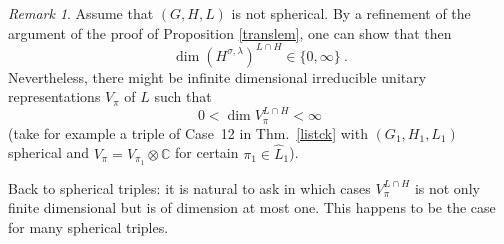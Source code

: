 \documentclass[10]{amsart}
\newtheorem{cor}[thm]{Corollary}
\theoremstyle{remark}
\newtheorem{rem}[thm]{Remark}
\theoremstyle{definition}
\numberwithin{equation}{section}
\newcommand{\e}{\text{e}}               %
\newcommand{\C}{\mathbb{C}}           %
\newcommand{\Ind}{\text{Ind}}
\newcommand{\fl}{{\mathfrak l}}
\begin{document}
{\noindent
%
%

\begin{rem} 
Assume that $(G,H,L)$ is not spherical. By a refinement of the argument of the proof of Proposition \ref{translem}, one can show  that then
$$ \dim (H^{\sigma,\lambda})^{L\cap H}\in \{0,\infty\}\ .$$
Nevertheless, there might be infinite dimensional irreducible unitary representations $V_\pi$ of $L$ such that $$0<\dim V_\pi^{L\cap H}<\infty$$ 
(take for example a triple
of Case~12 in Thm.~\ref{listck} with $(G_1,H_1,L_1)$ spherical and $V_\pi=V_{\pi_1}\otimes \C$ for certain $\pi_1\in \widehat L_1$).
\end{rem}

Back to spherical triples: it is natural to ask in which cases $V_\pi^{L\cap H}$ is not only finite dimensional but is of dimension at most one.
This happens to be the case for many spherical triples.

}
\end{document}
